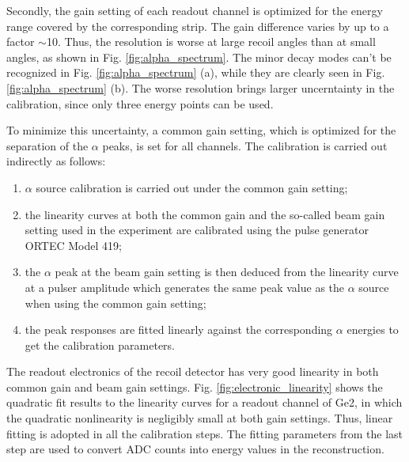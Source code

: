 \documentclass[number,5p]{elsarticle}
\begin{document}
Secondly, the gain setting of each readout channel is optimized for the energy range covered by the corresponding strip.
The gain difference varies by up to a factor $\mathtt{\sim}$10.
Thus, the resolution is worse at large recoil angles than at small angles, as shown in Fig. \ref{fig:alpha_spectrum}.
The minor decay modes can't be recognized in Fig. \ref{fig:alpha_spectrum} (a), while they are clearly seen in Fig. \ref{fig:alpha_spectrum} (b).
The worse resolution brings larger uncerntainty in the calibration, since only three energy points can be used.

To minimize this uncertainty, a common gain setting, which is optimized for the separation of the \(\alpha\) peaks, is set for all channels.
The calibration is carried out indirectly as follows:
\begin{enumerate}
\item \(\alpha\) source calibration is carried out under the common gain setting;
\item the linearity curves at both the common gain and the so-called beam gain
  setting used in the experiment are calibrated using the pulse generator ORTEC Model 419;
\item the $\alpha$ peak at the beam gain setting is then deduced
  from the linearity curve at a pulser amplitude which generates the same peak
  value as the $\alpha$ source when using the common gain setting;
\item the peak responses are fitted linearly against the corresponding $\alpha$ energies
  to get the calibration parameters.
\end{enumerate}
The readout electronics of the recoil detector has very good linearity in both
common gain and beam gain settings.
Fig. \ref{fig:electronic_linearity} shows the quadratic fit results to the linearity
curves for a readout channel of Ge2, in which the quadratic nonlinearity is
negligibly small at both gain settings.
Thus, linear fitting is adopted in all the calibration steps.
The fitting parameters from the last step are used to convert ADC counts into
energy values in the reconstruction.
\end{document}
